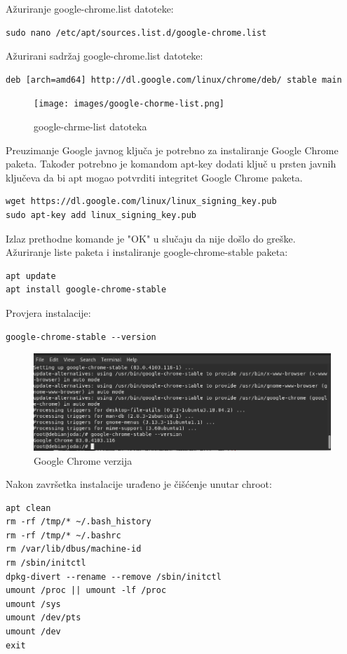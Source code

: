 \documentclass[12pt,vi]{mitthesis}
\begin{document}
\noindent
Ažuriranje google-chrome.list datoteke:
\begin{lstlisting}[style=BashInputStyle]
sudo nano /etc/apt/sources.list.d/google-chrome.list
\end{lstlisting}
Ažurirani sadržaj google-chrome.list datoteke:
\begin{lstlisting}[style=BashInputStyle]
deb [arch=amd64] http://dl.google.com/linux/chrome/deb/ stable main
\end{lstlisting}
\begin{figure}[!htb]
\centering
\texttt{[image: images/google-chorme-list.png]}
\caption{google-chrme-list datoteka}
\end{figure}
\noindent
Preuzimanje Google javnog ključa je potrebno za instaliranje Google Chrome paketa. Također potrebno je komandom apt-key dodati ključ u prsten javnih ključeva da bi apt mogao potvrditi integritet Google Chrome paketa.\\
\begin{lstlisting}[style=BashInputStyle]
wget https://dl.google.com/linux/linux_signing_key.pub
sudo apt-key add linux_signing_key.pub
\end{lstlisting}
\noindent
Izlaz prethodne komande je "OK" u slučaju da nije došlo do greške.\\
\indent
Ažuriranje liste paketa i instaliranje google-chrome-stable paketa:
\begin{lstlisting}[style=BashInputStyle]
apt update
apt install google-chrome-stable
\end{lstlisting}
\noindent
Provjera instalacije:
\begin{lstlisting}[style=BashInputStyle]
google-chrome-stable --version
\end{lstlisting}
\begin{figure}[!htb]
\centering
\includegraphics[width=\linewidth]{images/googlechromestableversion.png}
\caption{Google Chrome verzija}
\end{figure}
\noindent
Nakon završetka instalacije urađeno je čišćenje unutar chroot:
\begin{lstlisting}[style=BashInputStyle]
apt clean
rm -rf /tmp/* ~/.bash_history
rm -rf /tmp/* ~/.bashrc
rm /var/lib/dbus/machine-id
rm /sbin/initctl
dpkg-divert --rename --remove /sbin/initctl
umount /proc || umount -lf /proc
umount /sys
umount /dev/pts
umount /dev
exit
\end{lstlisting}
\end{document}
